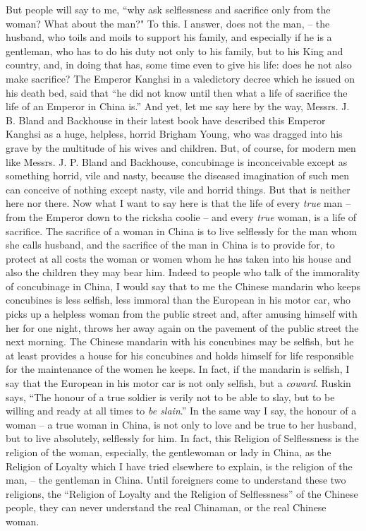 But people will say to me, ``why ask selflessness and sacrifice only from the woman?
What about the man?"
To this. I answer, does not the man,
--  the husband, who toils and moils to support his family,
and especially if he is a gentleman, who has to do his duty not only to his family,
but to his King and country, and, in doing that has,
some time even to give his life: does he not also make sacrifice?
The Emperor Kanghsi in a valedictory decree which he issued on his death bed, said that
``he did not know until then what a life of sacrifice the life of an Emperor in China is.''
And yet, let me say here by the way, Messrs. J. B. Bland and Backhouse in their latest book have described this Emperor Kanghsi as a huge, helpless, horrid Brigham Young,
who was dragged into his grave by the multitude of his wives and children.
But, of course, for modern men like Messrs. J. P. Bland and Backhouse,
concubinage is inconceivable except as something horrid, vile and nasty,
because the diseased imagination of such men can conceive of nothing except nasty, vile and horrid things.
But that is neither here nor there.
Now what I want to say here is that the life of every \emph{true} man
-- from the Emperor down to the ricksha coolie
-- and every \emph{true} woman, is a life of sacrifice.
The sacrifice of a woman in China is to live selflessly for the man whom she calls husband,
and the sacrifice of the man in China is to provide for,
to protect at all costs the woman or women whom he has taken into his house and also the children they may bear him.
Indeed to people who talk of the immorality of concubinage in China,
I would say that to me the Chinese mandarin who keeps concubines is less selfish,
less immoral than the European in his motor car,
who picks up a helpless woman from the public street and,
after amusing himself with her for one night,
throws her away again on the pavement of the public street the next morning.
The Chinese mandarin with his concubines may be selfish,
but he at least provides a house for his concubines and holds himself for life responsible for the maintenance of the women he keeps.
In fact, if the mandarin is selfish,
I say that the European in his motor car is not only selfish, but a \emph{coward}.
Ruskin says, ``The honour of a true soldier is verily not to be able to slay,
but to be willing and ready at all times to \emph{be slain}.''
In the same way I say, the honour of a woman -- a true woman in China,
is not only to love and be true to her husband, but to live absolutely, selflessly for him.
In fact, this Religion of Selflessness is the religion of the woman, especially,
the gentlewoman or lady in China,
as the Religion of Loyalty which I have tried elsewhere to explain,
is the religion of the man,  -- the gentleman in China.
Until foreigners come to understand these two religions,
the ``Religion of Loyalty and the Religion of Selflessness'' of the Chinese people,
they can never understand the real Chinaman, or the real Chinese woman.

